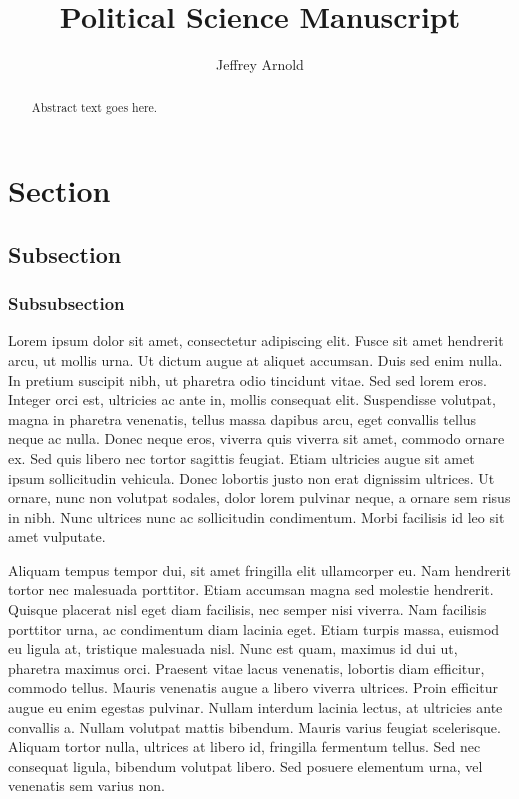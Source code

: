 \documentclass[12,letterpaper]{article}
\title{Political Science Manuscript}
\author{Jeffrey Arnold}
\date{}
\begin{document}
\maketitle

\begin{abstract}
Abstract text goes here.
\end{abstract}

\thispagestyle{empty}
\clearpage


\section{Section}\label{section}

\subsection{Subsection}\label{subsection}

\subsubsection{Subsubsection}\label{subsubsection}

Lorem ipsum dolor sit amet, consectetur adipiscing elit. Fusce sit amet
hendrerit arcu, ut mollis urna. Ut dictum augue at aliquet accumsan.
Duis sed enim nulla. In pretium suscipit nibh, ut pharetra odio
tincidunt vitae. Sed sed lorem eros. Integer orci est, ultricies ac ante
in, mollis consequat elit. Suspendisse volutpat, magna in pharetra
venenatis, tellus massa dapibus arcu, eget convallis tellus neque ac
nulla. Donec neque eros, viverra quis viverra sit amet, commodo ornare
ex. Sed quis libero nec tortor sagittis feugiat. Etiam ultricies augue
sit amet ipsum sollicitudin vehicula. Donec lobortis justo non erat
dignissim ultrices. Ut ornare, nunc non volutpat sodales, dolor lorem
pulvinar neque, a ornare sem risus in nibh. Nunc ultrices nunc ac
sollicitudin condimentum. Morbi facilisis id leo sit amet vulputate.

Aliquam tempus tempor dui, sit amet fringilla elit ullamcorper eu. Nam
hendrerit tortor nec malesuada porttitor. Etiam accumsan magna sed
molestie hendrerit. Quisque placerat nisl eget diam facilisis, nec
semper nisi viverra. Nam facilisis porttitor urna, ac condimentum diam
lacinia eget. Etiam turpis massa, euismod eu ligula at, tristique
malesuada nisl. Nunc est quam, maximus id dui ut, pharetra maximus orci.
Praesent vitae lacus venenatis, lobortis diam efficitur, commodo tellus.
Mauris venenatis augue a libero viverra ultrices. Proin efficitur augue
eu enim egestas pulvinar. Nullam interdum lacinia lectus, at ultricies
ante convallis a. Nullam volutpat mattis bibendum. Mauris varius feugiat
scelerisque. Aliquam tortor nulla, ultrices at libero id, fringilla
fermentum tellus. Sed nec consequat ligula, bibendum volutpat libero.
Sed posuere elementum urna, vel venenatis sem varius non.
\end{document}
